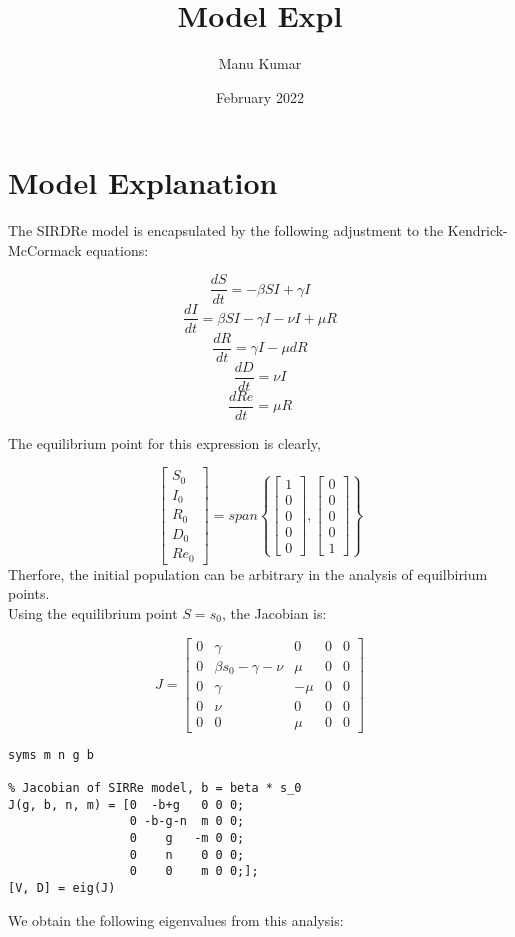 \documentclass{article}
\title{Model Expl}
\author{Manu Kumar}
\date{February 2022}
\begin{document}
\section{Model Explanation}

The SIRDRe model is encapsulated by the following adjustment to the Kendrick-McCormack equations:

$$ \frac{dS}{dt} = - \beta SI + \gamma I $$
$$ \frac{dI}{dt} = \beta SI - \gamma I - \nu I + \mu R $$
$$ \frac{dR}{dt} = \gamma I - \mu dR $$
$$ \frac{dD}{dt} = \nu I $$
$$ \frac{dRe}{dt} = \mu R $$

The equilibrium point for this expression is clearly,

$$
\begin{bmatrix}
    S_0 \\ 
    I_0 \\
    R_0 \\
    D_0 \\
    Re_0
\end{bmatrix} 
= 
span \left\{ \begin{bmatrix} 1 \\ 0 \\ 0 \\ 0 \\ 0 \end{bmatrix} , \begin{bmatrix} 0 \\ 0 \\ 0 \\ 0 \\ 1 \end{bmatrix} \right\}
$$
Therfore, the initial population can be arbitrary in the analysis of equilbirium points. \\
Using the equilibrium point $S = s_0$, the Jacobian is:

$$J = \begin{bmatrix}
    0 & \gamma & 0 & 0 & 0 \\
    0 & \beta s_0 -\gamma - \nu & \mu & 0 & 0 \\
    0 & \gamma & -\mu & 0 & 0 \\
    0 & \nu & 0 & 0 & 0 \\
    0 & 0 & \mu & 0 & 0 
\end{bmatrix}$$

\begin{verbatim}
syms m n g b

% Jacobian of SIRRe model, b = beta * s_0
J(g, b, n, m) = [0  -b+g   0 0 0;
                 0 -b-g-n  m 0 0;
                 0    g   -m 0 0;
                 0    n    0 0 0;
                 0    0    m 0 0;];
[V, D] = eig(J)

\end{verbatim}
We obtain the following eigenvalues from this analysis:
\end{document}
